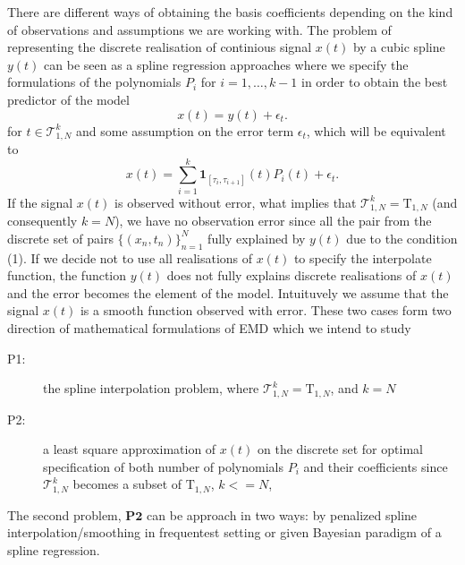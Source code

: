 \documentclass[article,moreauthors,pdftex,10pt,a4paper]{ssrn}
\begin{document}
There are different ways of obtaining the basis coefficients depending on the kind of observations and assumptions we are working with.
The problem of representing the discrete realisation of continious signal $x(t)$ by a cubic spline $y(t)$  can be seen as a spline regression approaches where we specify the formulations of the polynomials $P_i$ for $i = 1, \ldots, k-1$ in order to obtain the best predictor of the model
$$
x(t) = y(t) + \epsilon_t.
$$
for $t \in \mathcal{T}^k_{1,N}$ and some assumption on the error term $\epsilon_t$, which will be equivalent to 
$$
x(t) =  \sum_{i = 1}^k \mathbf{1}_{[\tau_i,\tau_{i+1}]} (t) P_i(t) + \epsilon_t.
$$
If the signal $x(t)$ is observed without error, what implies that $\mathcal{T}^k_{1,N} = \mathrm{T}_{1,N}$ (and consequently $k = N$), we have no observation error since all the pair from the discrete set of  pairs $\Big\{ (x_n, t_n) \Big\}_{n = 1}^N$ fully explained by $y(t)$ due to the condition (1). If we decide not to use all realisations of $x(t)$ to specify the interpolate function, the function $y(t)$  does not fully explains discrete realisations of $x(t)$ and the error becomes the element of the model.  Intuituvely we assume that  the signal $x(t)$ is a smooth function observed with error. These two cases form two direction of mathematical formulations of EMD which we intend to study
\begin{description}
\item[P1:] the spline interpolation problem, where $\mathcal{T}^k_{1,N} = \mathrm{T}_{1,N}$, and $k = N$
\item[P2:] a least square approximation of $x(t)$ on the discrete set for optimal specification of both number of polynomials $P_i$ and their coefficients since $\mathcal{T}^k_{1,N} $  becomes a subset of $\mathrm{T}_{1,N}$, $k<=N$,
\end{description}
The second problem, $\mathbf{P2}$ can be approach in two ways: by penalized spline interpolation/smoothing in frequentest setting or given Bayesian paradigm of a spline regression.
\end{document}
